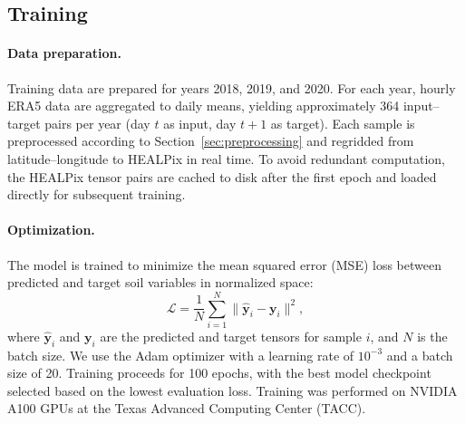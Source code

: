 \documentclass[11pt]{article}
\begin{document}
\subsection{Training}
\label{sec:training}

\paragraph{Data preparation.} Training data are prepared for years 2018, 2019, and 2020. For each year, hourly ERA5 data are aggregated to daily means, yielding approximately 364 input--target pairs per year (day $t$ as input, day $t+1$ as target). Each sample is preprocessed according to Section~\ref{sec:preprocessing} and regridded from latitude--longitude to HEALPix in real time. To avoid redundant computation, the HEALPix tensor pairs are cached to disk after the first epoch and loaded directly for subsequent training.

\paragraph{Optimization.} The model is trained to minimize the mean squared error (MSE) loss between predicted and target soil variables in normalized space:
\begin{equation}
    \mathcal{L} = \frac{1}{N} \sum_{i=1}^{N} \| \hat{\mathbf{y}}_i - \mathbf{y}_i \|^2,
    \label{eq:mse}
\end{equation}
where $\hat{\mathbf{y}}_i$ and $\mathbf{y}_i$ are the predicted and target tensors for sample $i$, and $N$ is the batch size. We use the Adam optimizer with a learning rate of $10^{-3}$ and a batch size of 20. Training proceeds for 100 epochs, with the best model checkpoint selected based on the lowest evaluation loss. Training was performed on NVIDIA A100 GPUs at the Texas Advanced Computing Center (TACC).
\end{document}
